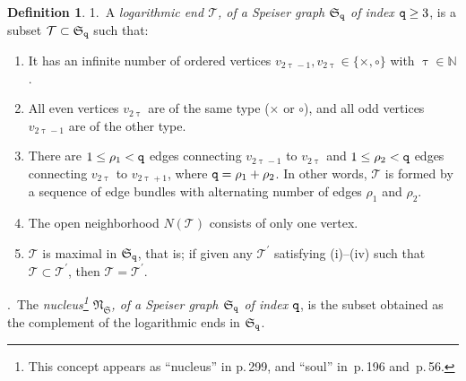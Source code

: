 \documentclass[final,3p,times]{elsarticle}
\newcommand{\NN}{\ensuremath{{\mathbb N}}}
\theoremstyle{definition}
\newtheorem{definition}[theorem]{Definition}
\begin{document}
\begin{definition}
\label{def:Log-end-for-Speiser-graph}
1.\ A \emph{logarithmic end
$\mathcal{T}$, 
of a Speiser graph $\mathfrak{S}_{\tt q}$ of index 
${\tt q} \geq 3$}, 
is a subset $\mathcal{T}\subset \mathfrak{S}_{\tt q}$
such that:
\begin{enumerate}[label=\roman*),leftmargin=*]

\item
It has an infinite number of ordered vertices 
$v_{2\uptau-1}, v_{2\uptau} \in \{ \times, \circ \}$ with 
$\uptau \in\NN$.

\item
All even vertices $v_{2\uptau}$ are of the same type
($\times $ or $\circ$), 
and all odd vertices $v_{2\uptau-1}$ are of the other type. 

\item 
There are $1\leq\rho_1 < {\tt q}$ edges connecting 
$v_{2\uptau-1}$ to $v_{2\uptau}$ and 
$1 \leq \rho_2 < {\tt q}$ edges connecting $v_{2\uptau}$ to $v_{2 \uptau+1}$,
where ${\tt q} = \rho_1 + \rho_2$.
In other words, $\mathcal{T}$ is formed by a sequence of edge bundles
with alternating number of edges $\rho_1$ and $\rho_2$.

\item The open neighborhood $N(\mathcal{T})$ 
consists of only one vertex.

\item
$\mathcal{T}$ is maximal in $\mathfrak{S}_{\tt q}$, 
that is;
if given any $\mathcal{T}^\prime$ satisfying (i)--(iv) such that
$\mathcal{T} \subset \mathcal{T}^\prime$,
then $\mathcal{T}= \mathcal{T}^\prime$.
\end{enumerate}


.\ The \emph{nucleus\footnote{
This concept 
appears as ``nucleus'' in \cite{Nevanlinna2} p.\,299,
and ``soul'' in 
\cite{AlvarezMucino1}\,p.\,196 and 
\cite{AlvarezMucino3}\,p.\,56.} 
$\mathfrak{N}_\mathfrak{S}$,  
of a Speiser graph $\mathfrak{S}_{\tt q}$ of index $\tt q$},  
is the subset obtained as the complement of the
logarithmic ends in $\mathfrak{S}_{\tt q}$.
\end{definition} 
\end{document}
